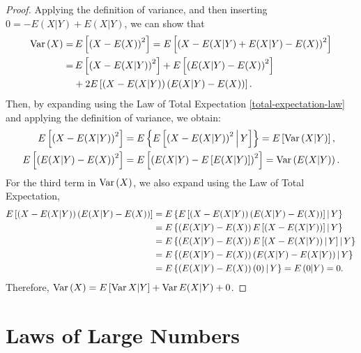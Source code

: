 \begin{proof}
    Applying the definition of variance, and then inserting $0 = - E(X|Y) + E(X|Y)$, we can show that
    \begin{align*}
        \operatorname{Var}\left(X\right) =&\,E\left[\left(X - E(X)\right)^2\right] = E\left[\left(X - E(X|Y) + E(X|Y) - E(X)\right)^2\right] \\
        =&\,E\left[\left(X - E(X|Y)\right)^2\right] + E\left[\left(E(X|Y) - E(X)\right)^2\right] \\
        &+ 2E\left[\left(X - E(X|Y)\right)\left(E(X|Y) - E(X)\right)\right].
    \end{align*}
    Then, by expanding using the Law of Total Expectation \ref{total-expectation-law} and applying the definition of variance, we obtain:
    \begin{align*}
        E\left[\left(X - E(X|Y)\right)^2\right] &= E\left\{E\left[\left(X - E(X|Y)\right)^2\,\middle|\, Y\right]\right\} = E\left[\operatorname{Var}\left(X|Y\right)\right], \\
        E\left[\left(E(X|Y) - E(X)\right)^2\right] &= E\left[\left(E(X|Y) - E\left[E(X|Y)\right]\right)^2\right] = \operatorname{Var}\left(E(X|Y)\right).
    \end{align*}
    For the third term in $\operatorname{Var}\left(X\right)$, we also expand using the Law of Total Expectation,
    \begin{align*}
        E\left[\left(X - E(X|Y)\right)\left(E(X|Y) - E(X)\right)\right] &= E\left\{E\left[\left(X - E(X|Y)\right)\left(E(X|Y) - E(X)\right)\right]\,\middle|\, Y\right\} \\
        &= E\left\{\left(E(X|Y) - E(X)\right)E\left[\left(X - E(X|Y)\right)\right]\,\middle|\, Y\right\} \\
        &= E\left\{\left(E(X|Y) - E(X)\right)E\left[\left(X - E(X|Y)\right)\,\middle|\, Y\right]\,\middle|\, Y\right\} \\
        &= E\left\{\left(E(X|Y) - E(X)\right)\left(E(X|Y) - E(X|Y)\right)\,\middle|\, Y\right\} \\
        &= E\left\{\left(E(X|Y) - E(X)\right)\left(0\right)\,\middle|\, Y\right\} = E\left(0|Y\right) = 0.
    \end{align*}
    Therefore, $\operatorname{Var}\left(X\right) = E\left[\operatorname{Var}{X|Y}\right] + \operatorname{Var}{E(X|Y)} + 0$.
\end{proof}

\section{Laws of Large Numbers}

